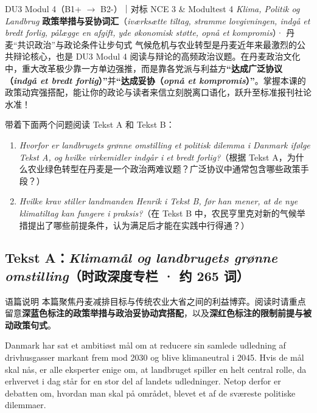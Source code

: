 {DU3 Modul 4（B1+ $\rightarrow$ B2-）｜对标 NCE 3 \& Modultest 4 \textit{Klima, Politik og Landbrug}}
{\textbf{政策举措与妥协词汇}（\textit{iværksætte tiltag, stramme lovgivningen, indgå et bredt forlig, pålægge en afgift, yde økonomisk støtte, opnå et kompromis}）· 丹麦“共识政治”与政论条件让步句式}
{气候危机与农业转型是丹麦近年来最激烈的公共辩论核心，也是 DU3 Modul 4 阅读与辩论的高频政治议题。在丹麦政治文化中，重大改革极少靠一方单边强推，而是靠各党派与利益方\textbf{“达成广泛协议（\textit{indgå et bredt forlig}）”}并\textbf{“达成妥协（\textit{opnå et kompromis}）”}。掌握本课的政策动宾强搭配，能让你的政论与读者来信立刻脱离口语化，跃升至标准报刊社论水准！}

\begin{foerduleaeser}
带着下面两个问题阅读 Tekst A 和 Tekst B：
\begin{enumerate}
  \item \textit{Hvorfor er landbrugets grønne omstilling et politisk dilemma i Danmark ifølge Tekst A, og hvilke virkemidler indgår i et bredt forlig?}（根据 Tekst A，为什么农业绿色转型在丹麦是一个政治两难议题？广泛协议中通常包含哪些政策手段？）
  \item \textit{Hvilke krav stiller landmanden Henrik i Tekst B, før han mener, at de nye klimatiltag kan fungere i praksis?}（在 Tekst B 中，农民亨里克对新的气候举措提出了哪些前提条件，认为满足后才能在实践中行得通？）
\end{enumerate}
\end{foerduleaeser}


\subsection*{Tekst A：\textit{Klimamål og landbrugets grønne omstilling}（时政深度专栏 · 约 265 词）}

\begin{tipbox}{语篇说明}
本篇聚焦丹麦减排目标与传统农业大省之间的利益博弈。阅读时请重点留意\textbf{\color{NCDNavy}深蓝色标注的政策举措与政治妥协动宾搭配}，以及\textbf{\color{NCDRed}深红色标注的限制前提与被动政策句式}。
\end{tipbox}

Danmark har sat et ambitiøst mål om at reducere sin samlede udledning af drivhusgasser markant frem mod 2030 og blive klimaneutral i 2045. Hvis de mål skal nås, er alle eksperter enige om, at landbruget spiller en helt central rolle, da erhvervet i dag står for en stor del af landets udledninger. Netop derfor er debatten om, hvordan man skal  på området, blevet et af de sværeste politiske dilemmaer.

